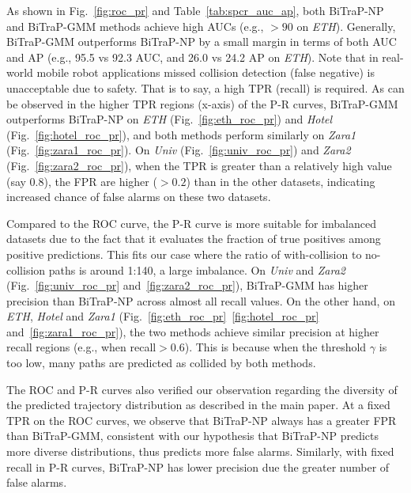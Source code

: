 \documentclass[letterpaper, 10 pt, conference]{ieeeconf}
\begin{document}
As shown in Fig.~\ref{fig:roc_pr} and Table~\ref{tab:spcr_auc_ap}, both BiTraP-NP and BiTraP-GMM methods achieve high AUCs (e.g., $>90$ on \textit{ETH}). Generally, BiTraP-GMM outperforms BiTraP-NP by a small margin in terms of both AUC and AP (e.g., 95.5 vs 92.3 AUC, and 26.0 vs 24.2 AP on \textit{ETH}). Note that in real-world mobile robot applications missed collision detection (false negative) is unacceptable due to safety. That is to say, a high TPR (recall) is required. As can be observed in the higher TPR regions (x-axis) of the P-R curves, BiTraP-GMM outperforms BiTraP-NP on \textit{ETH} (Fig.~\ref{fig:eth_roc_pr}) and \textit{Hotel} (Fig.~\ref{fig:hotel_roc_pr}), and both methods perform similarly on \textit{Zara1} (Fig.~\ref{fig:zara1_roc_pr}). On \textit{Univ} (Fig.~\ref{fig:univ_roc_pr}) and \textit{Zara2} (Fig.~\ref{fig:zara2_roc_pr}), when the TPR is greater than a relatively high value (say 0.8), the FPR are higher  ($>0.2$) than in the other datasets, indicating increased chance of false alarms on these two datasets. 

Compared to the ROC curve, the P-R curve is more suitable for imbalanced datasets  due to the fact that it evaluates the fraction of true positives among positive predictions. This fits our case where the ratio of with-collision to no-collision paths is around 1:140, a large imbalance. On \textit{Univ} and \textit{Zara2} (Fig.~\ref{fig:univ_roc_pr} and~\ref{fig:zara2_roc_pr}), BiTraP-GMM has higher precision than BiTraP-NP across almost all recall values. On the other hand, on \textit{ETH}, \textit{Hotel} and \textit{Zara1} (Fig.~\ref{fig:eth_roc_pr}~\ref{fig:hotel_roc_pr} and~\ref{fig:zara1_roc_pr}), the two methods achieve similar precision at higher recall regions (e.g., when recall$>0.6$). This is because when the threshold $\gamma$ is too low, many paths are predicted as collided by both methods. 

The ROC and P-R curves also verified our observation regarding the diversity of the predicted trajectory distribution as described in the main paper. At a fixed TPR on the ROC curves, we observe that BiTraP-NP always has a greater FPR than BiTraP-GMM, consistent with our hypothesis that BiTraP-NP predicts more diverse distributions,  thus predicts more false alarms. Similarly, with fixed recall in P-R curves, BiTraP-NP has lower precision due the greater number of false alarms.
\end{document}
